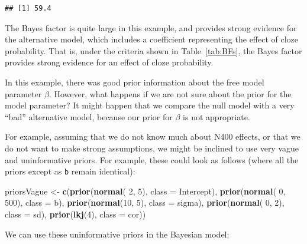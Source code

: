 \documentclass[12pt,]{krantz}
\newenvironment{Shaded}{\begin{snugshade}}{\end{snugshade}}
\newcommand{\DataTypeTok}[1]{\textcolor[rgb]{0.13,0.29,0.53}{#1}}
\newcommand{\DecValTok}[1]{\textcolor[rgb]{0.00,0.00,0.81}{#1}}
\newcommand{\KeywordTok}[1]{\textcolor[rgb]{0.13,0.29,0.53}{\textbf{#1}}}
\newcommand{\NormalTok}[1]{#1}
\newcommand{\StringTok}[1]{\textcolor[rgb]{0.31,0.60,0.02}{#1}}
\theoremstyle{definition}
\theoremstyle{definition}
\theoremstyle{definition}
\theoremstyle{remark}
\begin{document}
\begin{verbatim}
## [1] 59.4
\end{verbatim}

The Bayes factor is quite large in this example, and provides strong evidence for the alternative model, which includes a coefficient representing the effect of cloze probability. That is, under the criteria shown in Table~\ref{tab:BFs}, the Bayes factor provides strong evidence for an effect of cloze probability.

In this example, there was good prior information about the free model parameter \(\beta\). However, what happens if we are not sure about the prior for the model parameter? It might happen that we compare the null model with a very ``bad'' alternative model, because our prior for \(\beta\) is not appropriate.

For example, assuming that we do not know much about N400 effects, or that we do not want to make strong assumptions, we might be inclined to use very vague and uninformative priors. For example, these could look as follows (where all the priors except as \texttt{b} remain identical):

\begin{Shaded}
\begin{Highlighting}[]
\NormalTok{priorsVague <-}\StringTok{ }\KeywordTok{c}\NormalTok{(}\KeywordTok{prior}\NormalTok{(}\KeywordTok{normal}\NormalTok{( }\DecValTok{2}\NormalTok{, }\DecValTok{5}\NormalTok{), }\DataTypeTok{class =}\NormalTok{ Intercept),}
               \KeywordTok{prior}\NormalTok{(}\KeywordTok{normal}\NormalTok{( }\DecValTok{0}\NormalTok{, }\DecValTok{500}\NormalTok{), }\DataTypeTok{class =}\NormalTok{ b),}
               \KeywordTok{prior}\NormalTok{(}\KeywordTok{normal}\NormalTok{(}\DecValTok{10}\NormalTok{, }\DecValTok{5}\NormalTok{), }\DataTypeTok{class =}\NormalTok{ sigma),}
               \KeywordTok{prior}\NormalTok{(}\KeywordTok{normal}\NormalTok{( }\DecValTok{0}\NormalTok{, }\DecValTok{2}\NormalTok{), }\DataTypeTok{class =}\NormalTok{ sd),}
               \KeywordTok{prior}\NormalTok{(}\KeywordTok{lkj}\NormalTok{(}\DecValTok{4}\NormalTok{), }\DataTypeTok{class =}\NormalTok{ cor))}
\end{Highlighting}
\end{Shaded}

We can use these uninformative priors in the Bayesian model:
\end{document}
